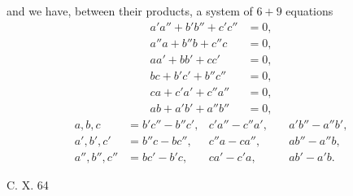 \documentclass[11pt]{article}
\begin{document}
and we have, between their products, a system of $6+9$ equations
\[
\begin{aligned}
a'a'' + b'b'' + c'c'' &= 0,\\
a''a + b''b + c''c &= 0,\\
aa' + bb' + cc' &= 0,\\
bc + b'c' + b''c'' &= 0,\\
ca + c'a' + c''a'' &= 0,\\
ab + a'b' + a''b'' &= 0,
\end{aligned}
\]
\[
\begin{aligned}
a, b, c &= b'c'' - b''c', & c'a'' - c''a', & \quad a'b'' - a''b',\\
a', b', c' &= b''c - bc'', & c''a - ca'', & \quad a b'' - a''b,\\
a'', b'', c'' &= bc' - b'c, & ca' - c'a, & \quad ab' - a'b.
\end{aligned}
\]

\medskip
\hfill C. X. \hfill 64
\end{document}

